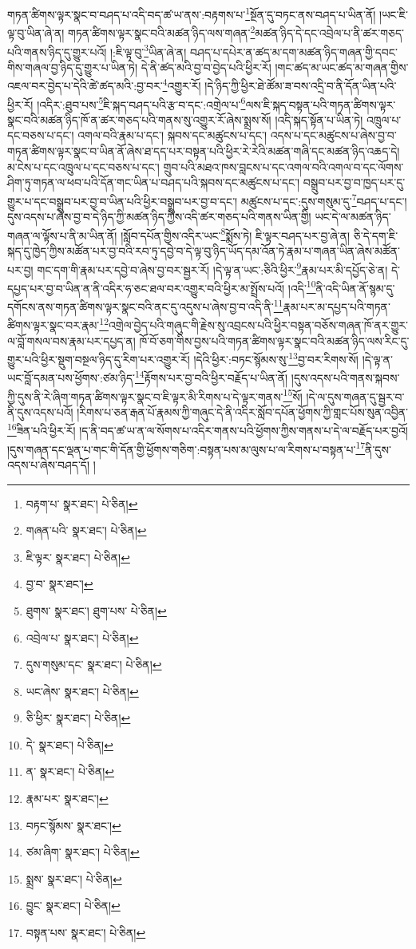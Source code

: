 གཏན་ཚིགས་ལྟར་སྣང་བ་བཤད་པ་འདི་བད་ཚ་ཡ་ནས་:བརྟགས་པ་\footnote{བརྟག་པ་  སྣར་ཐང་།  པེ་ཅིན། }སྔོན་དུ་བཏང་ནས་བཤད་པ་ཡིན་ནོ། །ཡང་ཇི་ལྟ་བུ་ཡིན་ཞེ་ན། གཏན་ཚིགས་ལྟར་སྣང་བའི་མཚན་ཉིད་ལས་གཞན་\footnote{གཞན་པའི་  སྣར་ཐང་།  པེ་ཅིན། }མཚན་ཉིད་དེ་དང་འབྲེལ་པ་ནི་ཚར་གཅད་པའི་གནས་ཉིད་དུ་གྱུར་པའོ། །:ཇི་ལྟ་བུ་\footnote{ཇི་ལྟར་  སྣར་ཐང་།  པེ་ཅིན། }ཡིན་ཞེ་ན། བཤད་པ་དཔེར་ན་ཚད་མ་དག་མཚན་ཉིད་གཞན་གྱི་དབང་གིས་གཞལ་བྱ་ཉིད་དུ་གྱུར་པ་ཡིན་ཏེ། དེ་ནི་ཚད་མའི་བྱ་བ་བྱེད་པའི་ཕྱིར་རོ། །གང་ཚད་མ་ཡང་ཚད་མ་གཞན་གྱིས་འཇལ་བར་བྱེད་པ་དེའི་ཚེ་ཚད་མའི་:བྱ་བར་\footnote{བྱ་བ་  སྣར་ཐང་། }འགྱུར་རོ། །དེ་ཉིད་ཀྱི་ཕྱིར་ཐེ་ཚོམ་ཟ་བས་འདྲི་བ་ནི་དོན་ཡིན་པའི་ཕྱིར་རོ། །འདིར་:ཐུབ་པས་\footnote{ཐུགས་  སྣར་ཐང་། ཐུག་པས་  པེ་ཅིན། }ཇི་སྐད་བཤད་པའི་རྩ་བ་དང་:འགྲེལ་པ་\footnote{འབྲེལ་པ་  སྣར་ཐང་།  པེ་ཅིན། }ལས་ཇི་སྐད་བསྟན་པའི་གཏན་ཚིགས་ལྟར་སྣང་བའི་མཚན་ཉིད་ཁོ་ན་ཚར་གཅད་པའི་གནས་སུ་འགྱུར་རོ་ཞེས་སྨྲས་སོ། །འདི་སྐད་སྟོན་པ་ཡིན་ཏེ། འཁྲུལ་པ་དང་བཅས་པ་དང་། འགལ་བའི་རྣམ་པ་དང་། སྐབས་དང་མཚུངས་པ་དང་། འདས་པ་དང་མཚུངས་པ་ཞེས་བྱ་བ་གཏན་ཚིགས་ལྟར་སྣང་བ་ཡིན་ནོ་ཞེས་ཐ་དད་པར་བསྟན་པའི་ཕྱིར་རེ་རེའི་མཚན་གཞི་དང་མཚན་ཉིད་འཆད་དེ། མ་ངེས་པ་དང་འཁྲུལ་པ་དང་བཅས་པ་དང་། གྲུབ་པའི་མཐའ་ཁས་བླངས་པ་དང་འགལ་བའི་འགལ་བ་དང་ལོགས་ཤིག་ཏུ་གཏན་ལ་ཕབ་པའི་དོན་གང་ཡིན་པ་བཤད་པའི་སྐབས་དང་མཚུངས་པ་དང་། བསྒྲུབ་པར་བྱ་བ་ཁྱད་པར་དུ་གྱུར་པ་དང་བསྒྲུབ་པར་བྱ་བ་ཡིན་པའི་ཕྱིར་བསྒྲུབ་པར་བྱ་བ་དང་། མཚུངས་པ་དང་:དུས་གསུམ་དུ་\footnote{དུས་གསུམ་དང་  སྣར་ཐང་།  པེ་ཅིན། }བཤད་པ་དང་། དུས་འདས་པ་ཞེས་བྱ་བ་དེ་ཉིད་ཀྱི་མཚན་ཉིད་ཀྱིས་འདི་ཚར་གཅད་པའི་གནས་ཡིན་གྱི། ཡང་དེ་ལ་མཚན་ཉིད་གཞན་ལ་ལྟོས་པ་ནི་མ་ཡིན་ནོ། །སློབ་དཔོན་གྱིས་འདིར་ཡང་\footnote{ཡང་ཞེས་  སྣར་ཐང་།  པེ་ཅིན། }སྨོས་ཏེ། ཇི་ལྟར་བཤད་པར་བྱ་ཞེ་ན། ཅི་དེ་དག་ཇི་སྐད་དུ་ཁྱེད་ཀྱིས་མཚོན་པར་བྱ་བའི་རབ་ཏུ་དབྱེ་བ་དེ་ལྟ་བུ་ཉིད་ཡོད་དམ་འོན་ཏེ་རྣམ་པ་གཞན་ཡིན་ཞེས་མཚོན་པར་བྱ། གང་དག་གི་རྣམ་པར་དབྱེ་བ་ཞེས་བྱ་བར་སྦྱར་རོ། །དེ་ལྟ་ན་ཡང་:ཅིའི་ཕྱིར་\footnote{ཅི་ཕྱིར་  སྣར་ཐང་།  པེ་ཅིན། }རྣམ་པར་མི་དཔྱོད་ཅེ་ན། དེ་དཔྱད་པར་བྱ་བ་ཡིན་ན་ནི་འདིར་ཧ་ཅང་ཐལ་བར་འགྱུར་བའི་ཕྱིར་མ་སྤྲོས་པའོ། །འདི་\footnote{དེ་  སྣར་ཐང་།  པེ་ཅིན། }ནི་འདི་ཡིན་ནོ་སྙམ་དུ་དགོངས་ནས་གཏན་ཚིགས་ལྟར་སྣང་བའི་ནང་དུ་འདུས་པ་ཞེས་བྱ་བ་འདི་ནི་\footnote{ན་  སྣར་ཐང་།  པེ་ཅིན། }རྣམ་པར་མ་དཔྱད་པའི་གཏན་ཚིགས་ལྟར་སྣང་བར་རྣམ་\footnote{རྣམ་པར་  སྣར་ཐང་། }འགྲེལ་བྱེད་པའི་གཞུང་གི་རྗེས་སུ་འབྲངས་པའི་ཕྱིར་བསྟན་བཅོས་གཞན་ཁོ་ནར་གྱུར་ལ་བློ་གསལ་བས་རྣམ་པར་དཔྱད་ན། ཁོ་བོ་ཅག་གིས་བྱས་པའི་གཏན་ཚིགས་ལྟར་སྣང་བའི་མཚན་ཉིད་ལས་རིང་དུ་གྱུར་པའི་ཕྱིར་སྡུག་བསྔལ་ཉིད་དུ་རིག་པར་འགྱུར་རོ། །དེའི་ཕྱིར་:བཏང་སྙོམས་སུ་\footnote{བཏང་སྙོམས་  སྣར་ཐང་། }བྱ་བར་རིགས་སོ། །དེ་ལྟ་ན་ཡང་བློ་དམན་པས་ཕྱོགས་:ཙམ་ཉིད་\footnote{ཙམ་ཞིག་  སྣར་ཐང་།  པེ་ཅིན། }རྟོགས་པར་བྱ་བའི་ཕྱིར་བརྗོད་པ་ཡིན་ནོ། །དུས་འདས་པའི་གནས་སྐབས་ཀྱི་དུས་ནི་རེ་ཞིག་གཏན་ཚིགས་ལྟར་སྣང་བ་ཇི་ལྟར་མི་རིགས་པ་དེ་ལྟར་གནས་\footnote{སྨྲས་  སྣར་ཐང་།  པེ་ཅིན། }སོ། །དེ་ལ་དུས་གཞན་དུ་སྦྱར་བ་ནི་དུས་འདས་པའོ། །རིགས་པ་ཅན་རྒན་པོ་རྣམས་ཀྱི་གཞུང་དེ་ནི་འདིར་སློབ་དཔོན་ཕྱོགས་ཀྱི་གླང་པོས་སུན་འབྱིན་\footnote{བྱུང་  སྣར་ཐང་།  པེ་ཅིན། }ཟིན་པའི་ཕྱིར་རོ། །ད་ནི་བད་ཚ་ཡ་ན་ལ་སོགས་པ་འདིར་གནས་པའི་ཕྱོགས་ཀྱིས་གནས་པ་དེ་ལ་བརྗོད་པར་བྱའོ། །དུས་གཞན་དང་ལྡན་པ་གང་གི་དོན་གྱི་ཕྱོགས་གཅིག་:བསྟན་པས་མ་ལུས་པ་ལ་རིགས་པ་བསྟན་པ་\footnote{བསྟན་པས་  སྣར་ཐང་།  པེ་ཅིན། }ནི་དུས་འདས་པ་ཞེས་བཤད་དོ། །
